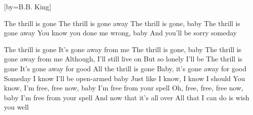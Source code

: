 [by={B.B. King}]


  \beginverse
  The thrill is gone
  The thrill is gone away
  The thrill is gone, baby
  The thrill is gone away
  You know you done me wrong, baby
  And you'll be sorry someday
  \endverse
  
  \chordsoff

  \beginverse  
  The thrill is gone
  It's gone away from me
  The thrill is gone, baby
  The thrill is gone away from me
  Although, I'll still live on
  But so lonely I'll be
  \endverse
  \beginverse  
  The thrill is gone
  It's gone away for good
  All the thrill is gone
  Baby, it's gone away for good
  Someday I know I'll be open-armed baby
  Just like I know, I know I should
  \endverse
  \beginverse  
  You know, I'm free, free now, baby
  I'm free from your spell
  Oh, free, free, free now, baby
  I'm free from your spell
  And now that it's all over
  All that I can do is wish you well
  \endverse
\endsong
